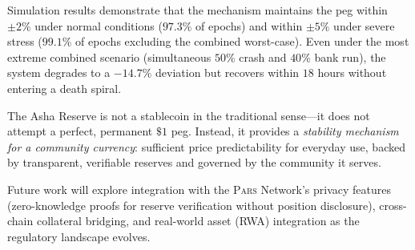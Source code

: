 \documentclass[11pt,a4paper]{article}
\newcommand{\Pars}{\textsc{Pars}\xspace}
\begin{document}
Simulation results demonstrate that the mechanism maintains the peg within $\pm 2\%$ under normal conditions ($97.3\%$ of epochs) and within $\pm 5\%$ under severe stress ($99.1\%$ of epochs excluding the combined worst-case).
Even under the most extreme combined scenario (simultaneous $50\%$ crash and $40\%$ bank run), the system degrades to a $-14.7\%$ deviation but recovers within $18$ hours without entering a death spiral.

The Asha Reserve is not a stablecoin in the traditional sense---it does not attempt a perfect, permanent $\$1$ peg.
Instead, it provides a \emph{stability mechanism for a community currency}: sufficient price predictability for everyday use, backed by transparent, verifiable reserves and governed by the community it serves.

Future work will explore integration with the \Pars Network's privacy features (zero-knowledge proofs for reserve verification without position disclosure), cross-chain collateral bridging, and real-world asset (RWA) integration as the regulatory landscape evolves.



\end{document}
